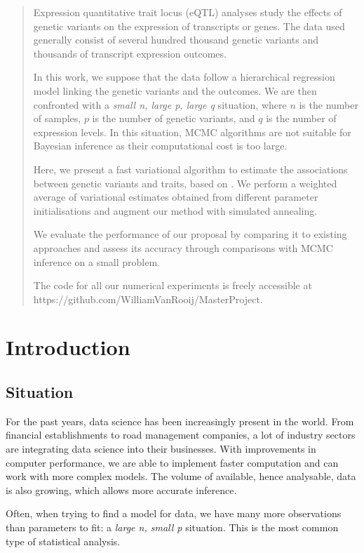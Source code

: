 \documentclass[a4paper, 11pt]{report}
\numberwithin{equation}{chapter}
\begin{document}
\newpage
\begin{abstract}
Expression quantitative trait locus (eQTL) analyses study the effects of genetic variants on the expression of transcripts or genes. The data used generally consist of several hundred thousand genetic variants and thousands of transcript expression outcomes. 

In this work, we suppose that the data follow a hierarchical regression model linking the genetic variants and the outcomes. We are then confronted with a \textit{small n, large p, large q} situation, where $n$ is the number of samples, $p$ is the number of genetic variants, and $q$ is the number of expression levels. In this situation, MCMC algorithms are not suitable for Bayesian inference as their computational cost is too large. 

Here, we present a fast variational algorithm to estimate the associations between genetic variants and traits, based on \citet{eff_inf}. We perform a weighted average of variational estimates obtained from different parameter initialisations and augment our method with simulated annealing.

We evaluate the performance of our proposal by comparing it to existing approaches and assess its accuracy through comparisons with MCMC inference on a small problem.

The code for all our numerical experiments is freely accessible at \\
https://github.com/WilliamVanRooij/MasterProject.
\end{abstract}
\tableofcontents
\newpage
\chapter{Introduction}
\section{Situation}
For the past years, data science has been increasingly present in the world. From financial establishments to road management companies, a lot of industry sectors are integrating data science into their businesses. With improvements in computer performance, we are able to implement faster computation and can work with more complex models. The volume of available, hence analysable, data is also growing, which allows more accurate inference.

Often, when trying to find a model for data, we have many more observations than parameters to fit: a \textit{large n, small p} situation. This is the most common type of statistical analysis. 
\end{document}
